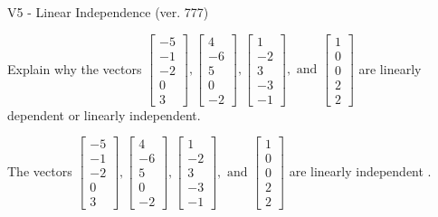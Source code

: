 \begin{exercise}
  \begin{exerciseTitle}V5 - Linear Independence (ver. 777)\end{exerciseTitle}
  \begin{exerciseStatement}
    Explain why the vectors \(\left[\begin{array}{r}
-5 \\
-1 \\
-2 \\
0 \\
3
\end{array}\right] , \left[\begin{array}{r}
4 \\
-6 \\
5 \\
0 \\
-2
\end{array}\right] , \left[\begin{array}{r}
1 \\
-2 \\
3 \\
-3 \\
-1
\end{array}\right] , \text{ and } \left[\begin{array}{r}
1 \\
0 \\
0 \\
2 \\
2
\end{array}\right]\) are linearly dependent or linearly independent.	


  \end{exerciseStatement}
  \begin{exerciseAnswer}
   The vectors \(\left[\begin{array}{r}
-5 \\
-1 \\
-2 \\
0 \\
3
\end{array}\right] , \left[\begin{array}{r}
4 \\
-6 \\
5 \\
0 \\
-2
\end{array}\right] , \left[\begin{array}{r}
1 \\
-2 \\
3 \\
-3 \\
-1
\end{array}\right] , \text{ and } \left[\begin{array}{r}
1 \\
0 \\
0 \\
2 \\
2
\end{array}\right]\) are 
  	 linearly independent  .
  


  \end{exerciseAnswer}
\end{exercise}